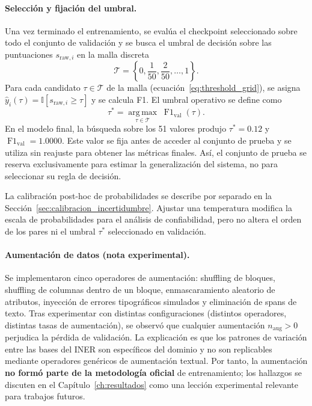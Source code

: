 \paragraph{Selección y fijación del umbral.}
Una vez terminado el entrenamiento, se evalúa el checkpoint seleccionado sobre todo el conjunto de validación y se busca el umbral de decisión sobre las puntuaciones $s_{\mathrm{raw},i}$ en la malla discreta
\begin{equation}
    \mathcal{T}=\left\{0, \frac{1}{50}, \frac{2}{50}, \ldots, 1\right\}.
    \label{eq:threshold_grid}
\end{equation}
Para cada candidato $\tau\in\mathcal{T}$ de la malla (ecuación~\ref{eq:threshold_grid}), se asigna $\hat{y}_i(\tau)=\mathbb{I}[s_{\mathrm{raw},i}\geq\tau]$ y se calcula F1. El umbral operativo se define como
\begin{equation}
    \tau^*=\underset{\tau\in\mathcal{T}}{\operatorname{arg\,max}}\; \operatorname{F1}_{\mathrm{val}}(\tau).
    \label{eq:threshold_selection}
\end{equation}
En el modelo final, la búsqueda sobre los 51 valores produjo $\tau^*=0.12$ y $\operatorname{F1}_{\mathrm{val}}=1.0000$. Este valor se fija antes de acceder al conjunto de prueba y se utiliza sin reajuste para obtener las métricas finales. Así, el conjunto de prueba se reserva exclusivamente para estimar la generalización del sistema, no para seleccionar su regla de decisión.

La calibración post-hoc de probabilidades se describe por separado en la Sección~\ref{sec:calibracion_incertidumbre}. Ajustar una temperatura modifica la escala de probabilidades para el análisis de confiabilidad, pero no altera el orden de los pares ni el umbral $\tau^*$ seleccionado en validación.

\paragraph{Aumentación de datos (nota experimental).}
Se implementaron cinco operadores de aumentación: shuffling de bloques, shuffling de columnas dentro de un bloque, enmascaramiento aleatorio de atributos, inyección de errores tipográficos simulados y eliminación de spans de texto. Tras experimentar con distintas configuraciones (distintos operadores, distintas tasas de aumentación), se observó que cualquier aumentación $n_{\text{aug}} > 0$ perjudica la pérdida de validación. La explicación es que los patrones de variación entre las bases del INER son específicos del dominio y no son replicables mediante operadores genéricos de aumentación textual. Por tanto, la aumentación \textbf{no formó parte de la metodología oficial} de entrenamiento; los hallazgos se discuten en el Capítulo~\ref{ch:resultados} como una lección experimental relevante para trabajos futuros.


